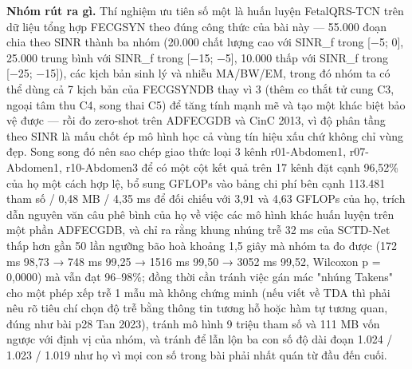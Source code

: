 \documentclass[12pt,a4paper]{article}
\begin{document}
\noindent \textbf{\color{tdtblue}Nhóm rút ra gì.} Thí nghiệm ưu tiên số một là huấn luyện FetalQRS-TCN trên dữ liệu tổng hợp FECGSYN theo đúng công thức của bài này — 55.000 đoạn chia theo SINR thành ba nhóm (20.000 chất lượng cao với SINR\_f trong [−5; 0], 25.000 trung bình với SINR\_f trong [−15; −5], 10.000 thấp với SINR\_f trong [−25; −15]), các kịch bản sinh lý và nhiễu MA/BW/EM, trong đó nhóm ta có thể dùng cả 7 kịch bản của FECGSYNDB thay vì 3 (thêm co thắt tử cung C3, ngoại tâm thu C4, song thai C5) để tăng tính mạnh mẽ và tạo một khác biệt bảo vệ được — rồi đo zero-shot trên ADFECGDB và CinC 2013, vì độ phân tầng theo SINR là mấu chốt ép mô hình học cả vùng tín hiệu xấu chứ không chỉ vùng đẹp. Song song đó nên sao chép giao thức loại 3 kênh r01-Abdomen1, r07-Abdomen1, r10-Abdomen3 để có một cột kết quả trên 17 kênh đặt cạnh 96,52\% của họ một cách hợp lệ, bổ sung GFLOPs vào bảng chi phí bên cạnh 113.481 tham số / 0,48 MB / 4,35 ms để đối chiếu với 3,91 và 4,63 GFLOPs của họ, trích dẫn nguyên văn câu phê bình của họ về việc các mô hình khác huấn luyện trên một phần ADFECGDB, và chỉ ra rằng khung nhúng trễ 32 ms của SCTD-Net thấp hơn gần 50 lần ngưỡng bão hoà khoảng 1,5 giây mà nhóm ta đo được (172 ms 98,73 → 748 ms 99,25 → 1516 ms 99,50 → 3052 ms 99,52, Wilcoxon p = 0,0000) mà vẫn đạt 96–98\%; đồng thời cần tránh việc gán mác "nhúng Takens" cho một phép xếp trễ 1 mẫu mà không chứng minh (nếu viết về TDA thì phải nêu rõ tiêu chí chọn độ trễ bằng thông tin tương hỗ hoặc hàm tự tương quan, đúng như bài p28 Tan 2023), tránh mô hình 9 triệu tham số và 111 MB vốn ngược với định vị của nhóm, và tránh để lẫn lộn ba con số độ dài đoạn 1.024 / 1.023 / 1.019 như họ vì mọi con số trong bài phải nhất quán từ đầu đến cuối.\par\vspace{3pt}
\vspace{6pt}
\end{document}
